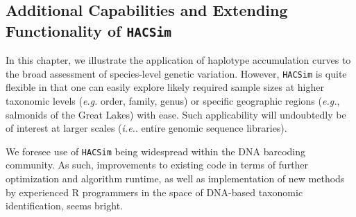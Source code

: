 \subsection{Additional Capabilities and Extending Functionality of \tt{HACSim}}

In this chapter, we illustrate the application of haplotype accumulation curves to the broad assessment of species-level genetic variation. However, {\tt HACSim} is quite flexible in that one can easily explore likely required sample sizes at higher taxonomic levels (\textit{e.g.} order, family, genus) or specific geographic regions (\textit{e.g.}, salmonids of the Great Lakes) with ease. Such applicability will undoubtedly be of interest at larger scales (\textit{i.e.}. entire genomic sequence libraries). 



We foresee use of {\tt HACSim} being widespread within the DNA barcoding community. As such, improvements to existing code in terms of further optimization and algorithm runtime, as well as implementation of new methods by experienced R programmers in the space of DNA-based taxonomic identification, seems bright.



